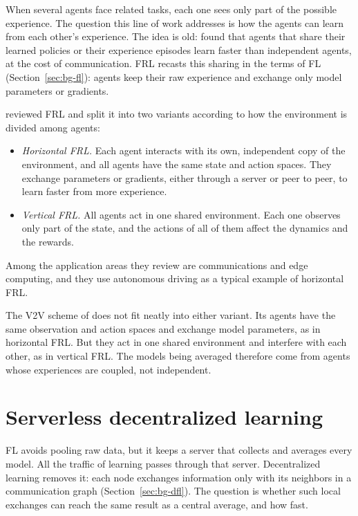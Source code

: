 When several agents face related tasks, each one sees only part of the possible experience. The question
this line of work addresses is how the agents can learn from each other's experience. The idea is old:
\citet{tan93independent} found that agents that share their learned policies or their experience episodes
learn faster than independent agents, at the cost of communication. \Ac{FRL} recasts this sharing in the
terms of \ac{FL} (Section~\ref{sec:bg-fl}): agents keep their raw experience and exchange only model
parameters or gradients.

\citet{qi+21frl} reviewed \ac{FRL} and split it into two variants according to how the environment is
divided among agents:
\begin{itemize}[nosep]
  \item \emph{Horizontal \ac{FRL}.} Each agent interacts with its own, independent copy of the
    environment, and all agents have the same state and action spaces. They exchange parameters or
    gradients, either through a server or peer to peer, to learn faster from more experience.
  \item \emph{Vertical \ac{FRL}.} All agents act in one shared environment. Each one observes only part
    of the state, and the actions of all of them affect the dynamics and the rewards.
\end{itemize}
Among the application areas they review are communications and edge computing, and they use autonomous
driving as a typical example of horizontal \ac{FRL}.

The \ac{V2V} scheme of \citet{li+22fedmarl} does not fit neatly into either variant. Its agents have the
same observation and action spaces and exchange model parameters, as in horizontal \ac{FRL}. But they act
in one shared environment and interfere with each other, as in vertical \ac{FRL}. The models being
averaged therefore come from agents whose experiences are coupled, not independent.

\section{Serverless decentralized learning}
\label{sec:rw-dfl}

\Ac{FL} avoids pooling raw data, but it keeps a server that collects and averages every model. All the
traffic of learning passes through that server. Decentralized learning removes it: each node exchanges
information only with its neighbors in a communication graph (Section~\ref{sec:bg-dfl}). The question is
whether such local exchanges can reach the same result as a central average, and how fast.

